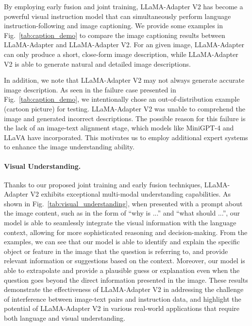 \documentclass[10pt,twocolumn,letterpaper]{article}
\begin{document}
By employing early fusion and joint training, LLaMA-Adapter V2 has become a powerful visual instruction model that can simultaneously perform language instruction-following and image captioning. 
We provide some examples in Fig.~\ref{tab:caption_demo} to compare the image captioning results between LLaMA-Adapter and LLaMA-Adapter V2. 
For an given image, LLaMA-Adapter can only produce a short, close-form image description, while LLaMA-Adapter V2 is able to generate natural and detailed image descriptions.

In addition, we note that LLaMA-Adapter V2 may not always generate accurate image description. 
As seen in the failure case presented in Fig.~\ref{tab:caption_demo}, we intentionally chose an out-of-distribution example (cartoon picture) for testing. LLaMA-Adapter V2 was unable to comprehend the image and generated incorrect descriptions.
The possible reason for this failure is the lack of an image-text alignment stage, which models like MiniGPT-4 and LLaVA have incorporated. 
This motivates us to employ additional expert systems to enhance the image understanding ability.


\paragraph{Visual Understanding.}
Thanks to our proposed joint training and early fusion techniques, LLaMA-Adapter V2 exhibits exceptional multi-modal understanding capabilities. 
As shown in Fig.~\ref{tab:visual_understanding}, when presented with a prompt about the image content, such as in the form of ``why is ...'' and ``what should ...'', our model is able to seamlessly integrate the visual information with the language context, allowing for more sophisticated reasoning and decision-making. From the examples, we can see that our model is able to identify and explain the specific object or feature in the image that the question is referring to, and provide relevant information or suggestions based on the context. Moreover, our model is able to extrapolate and provide a plausible guess or explanation even when the question goes beyond the direct information presented in the image. 
These results demonstrate the effectiveness of LLaMA-Adapter V2 in addressing the challenge of interference between image-text pairs and instruction data, and highlight the potential of LLaMA-Adapter V2 in various real-world applications that require both language and visual understanding.
\end{document}
